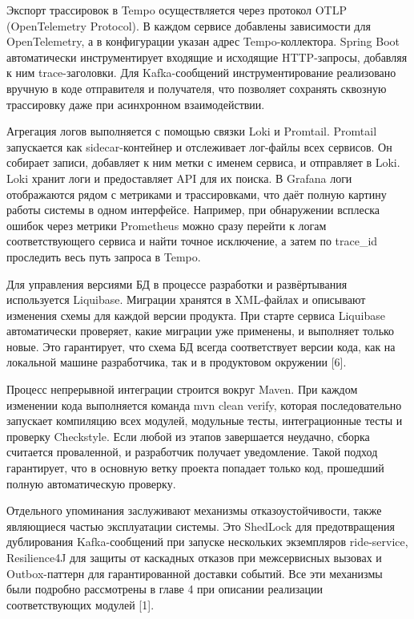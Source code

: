 {\par \redline Экспорт трассировок в Tempo осуществляется через протокол OTLP (OpenTelemetry Protocol). В каждом сервисе добавлены зависимости для OpenTelemetry, а в конфигурации указан адрес Tempo-коллектора. Spring Boot автоматически инструментирует входящие и исходящие HTTP-запросы, добавляя к ним trace-заголовки. Для Kafka-сообщений инструментирование реализовано вручную в коде отправителя и получателя, что позволяет сохранять сквозную трассировку даже при асинхронном взаимодействии.

\par \redline Агрегация логов выполняется с помощью связки Loki и Promtail. Promtail запускается как sidecar-контейнер и отслеживает лог-файлы всех сервисов. Он собирает записи, добавляет к ним метки с именем сервиса, и отправляет в Loki. Loki хранит логи и предоставляет API для их поиска. В Grafana логи отображаются рядом с метриками и трассировками, что даёт полную картину работы системы в одном интерфейсе. Например, при обнаружении всплеска ошибок через метрики Prometheus можно сразу перейти к логам соответствующего сервиса и найти точное исключение, а затем по trace\_id проследить весь путь запроса в Tempo.

\par \redline Для управления версиями БД в процессе разработки и развёртывания используется Liquibase. Миграции хранятся в XML-файлах и описывают изменения схемы для каждой версии продукта. При старте сервиса Liquibase автоматически проверяет, какие миграции уже применены, и выполняет только новые. Это гарантирует, что схема БД всегда соответствует версии кода, как на локальной машине разработчика, так и в продуктовом окружении [6].

\par \redline Процесс непрерывной интеграции строится вокруг Maven. При каждом изменении кода выполняется команда mvn clean verify, которая последовательно запускает компиляцию всех модулей, модульные тесты, интеграционные тесты и проверку Checkstyle. Если любой из этапов завершается неудачно, сборка считается проваленной, и разработчик получает уведомление. Такой подход гарантирует, что в основную ветку проекта попадает только код, прошедший полную автоматическую проверку.

\par \redline Отдельного упоминания заслуживают механизмы отказоустойчивости, также являющиеся частью эксплуатации системы. Это ShedLock для предотвращения дублирования Kafka-сообщений при запуске нескольких экземпляров ride-service, Resilience4J для защиты от каскадных отказов при межсервисных вызовах и Outbox-паттерн для гарантированной доставки событий. Все эти механизмы были подробно рассмотрены в главе 4 при описании реализации соответствующих модулей [1].

\par
}

\setcounter{subchaptercntr}{1}
\setcounter{formulacntr}{1}
\setcounter{imagecntr}{1}
\setcounter{tablecntr}{1}
\setcounter{itemcntr}{1}

